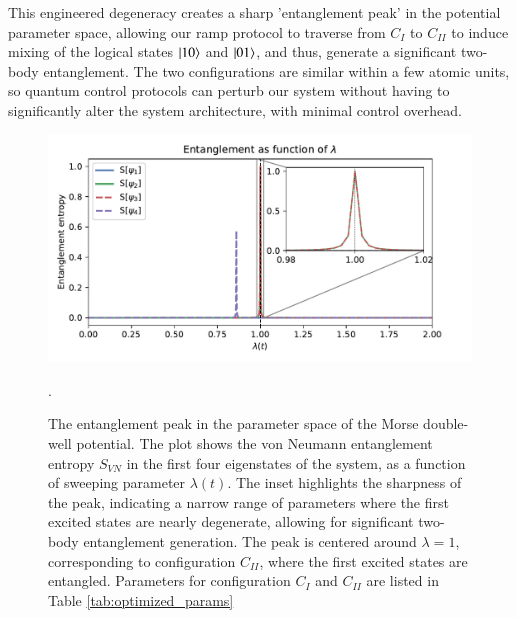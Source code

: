 \documentclass{subfiles}
\begin{document}
This engineered degeneracy creates a sharp 'entanglement peak' in the potential parameter space, allowing our ramp protocol to traverse from $C_I$ to $C_{II}$ to induce mixing of the logical states $\ket{10}$ and $\ket{01}$, and thus, generate a significant two-body entanglement. The two configurations are similar within a few atomic units, so quantum control protocols can perturb our system without having to significantly alter the system architecture, with minimal control overhead.
\begin{figure}[h!]
  \centering
  \includegraphics[width=1.0\textwidth]{figs/entanglement_peak.pdf}
  \caption{The entanglement peak in the parameter space of the Morse double-well potential. The plot shows the von Neumann entanglement entropy $S_{VN}$ in the first four eigenstates of the system, as a function of sweeping parameter $\lambda(t)$. The inset highlights the sharpness of the peak, indicating a narrow range of parameters where the first excited states are nearly degenerate, allowing for significant two-body entanglement generation. The peak is centered around $\lambda = 1$, corresponding to configuration $C_{II}$, where the first excited states are entangled. Parameters for configuration $C_I$ and $C_{II}$ are listed in Table \ref{tab:optimized_params}}. 
  \label{fig:entanglement_peak}
\end{figure}
\end{document}
